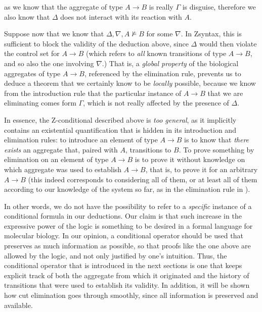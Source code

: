 as we know that the aggregate of type $A \rightarrow B$ is really $\Gamma$ is
disguise, therefore we also know that $\Delta$ does not interact with its
reaction with $A$.

Suppose now that we know that $\Delta, \nabla, A \not \models B$ for some
$\nabla$. In Zsyntax, this is sufficient to block the validity of the deduction
above, since $\Delta$ would then violate the control set for $A \rightarrow B$
(which refers to \emph{all} known transitions of type $A \rightarrow B$, and so
also the one involving $\nabla$.) That is, a \emph{global property} of the
biological aggregates of type $A \rightarrow B$, referenced by the elimination
rule, prevents us to deduce a theorem that we certainly know to be
\emph{locally} possible, because we know from the introduction rule that the
particular instance of $A \rightarrow B$ that we are eliminating comes form
$\Gamma$, which is not really affected by the presence of $\Delta$.

In essence, the Z-conditional described above is \emph{too general}, as it
implicitly contains an existential quantification that is hidden in its
introduction and elimination rules: to introduce an element of type
$A \rightarrow B$ is to know that \emph{there exists} an aggregate that, paired
with $A$, transitions to $B$. To prove something by elimination on an element of
type $A \rightarrow B$ is to prove it without knowledge on which aggregate was
used to establish $A \rightarrow B$, that is, to prove it for an arbitrary
$A \rightarrow B$ (this indeed corresponds to considering all of them, or at
least all of them according to our knowledge of the system so far, as in the
elimination rule in \cite{adding-logic}).

In other words, we do not have the possibility to refer to a \emph{specific}
instance of a conditional formula in our deductions. Our claim is that such
increase in the expressive power of the logic is something to be desired in a
formal language for molecular biology. In our opinion, a conditional operator
should be used that preserves as much information as possible, so that proofs
like the one above are allowed by the logic, and not only justified by one's
intuition. Thus, the conditional operator that is introduced in the next
sections is one that keeps explicit track of both the aggregate from which it
originated and the history of transitions that were used to establish its
validity. In addition, it will be shown how cut elimination goes through
smoothly, since all information is preserved and available.

